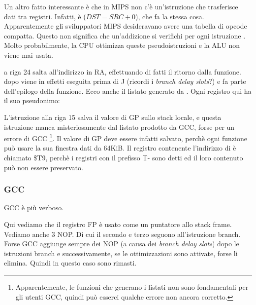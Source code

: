 Un altro fatto interessante è che in MIPS non c'è un'istruzione che trasferisce dati tra registri.
Infatti,  è  ($DST=SRC+0$), che fa la stessa cosa.
Apparentemente gli sviluppatori MIPS desideravano avere una tabella di opcode compatta.
Questo non significa che un'addizione si verifichi per ogni istruzione .
Molto probabilmente, la \ac{CPU} ottimizza queste pseudoistruzioni e la \ac{ALU} non viene mai usata.


 a riga 24 salta all'indirizzo in \ac{RA}, effettuando di fatti il ritorno dalla funzione.
 dopo  viene in effetti eseguita prima di J (ricordi i \emph{branch delay slots}?) e fa parte dell'epilogo della funzione.
Ecco anche il listato generato da \IDA. Ogni registro qui ha il suo pseudonimo:



L'istruzione alla riga 15 salva il valore di GP sullo stack locale, e questa istruzione manca misteriosamente dal listato prodotto da GCC, forse per un errore di GCC
\footnote{Apparentemente, le funzioni che generano i listati non sono fondamentali per gli utenti GCC, quindi può esserci qualche errore
non ancora corretto.}.
Il valore di GP deve essere infatti salvato, perchè ogni funzione può usare la sua finestra dati da 64KiB.
Il registro contenente l'indirizzo di \puts è chiamato \$T9, perchè i registri con il prefisso T- sono detti
 ed il loro contenuto può non essere preservato.

\subsubsection{\NonOptimizing GCC}

\NonOptimizing GCC è più verboso.



Qui vediamo che il registro FP è usato come un puntatore allo stack frame.
Vediamo anche 3 \ac{NOP}.
Di cui il secondo e terzo seguono all'istruzione branch.
Forse GCC aggiunge sempre dei \ac{NOP} (a causa dei \emph{branch delay slots}) dopo le istruzioni branch
e successivamente, se le ottimizzazioni sono attivate, forse li elimina.
Quindi in questo caso sono rimasti.

